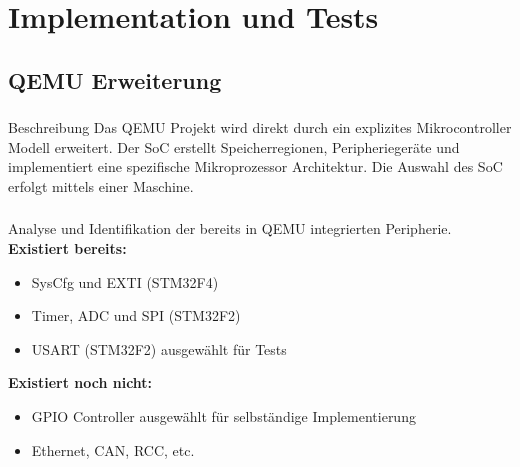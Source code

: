 
\section{Implementation und Tests}

\begin{frame}[fragile]
    \begin{center}
        \huge\textbf{\insertsection}
    \end{center}
\end{frame}

\subsection{QEMU Erweiterung}

\begin{frame}[fragile]
\frametitle{\insertsection}
\framesubtitle{\insertsubsection}

\begin{block}{Beschreibung}
Das QEMU Projekt wird direkt durch ein explizites Mikrocontroller Modell
erweitert.\newline
Der SoC erstellt Speicherregionen, Peripheriegeräte und implementiert\newline
eine spezifische Mikroprozessor Architektur.\newline
Die Auswahl des SoC erfolgt mittels einer Maschine.
\end{block}

\end{frame}

\begin{frame}[fragile]
\frametitle{\insertsection}
\framesubtitle{\insertsubsection}

Analyse und Identifikation der bereits in QEMU integrierten Peripherie.\newline
\textbf{Existiert bereits:}
\begin{itemize}
    \item SysCfg und EXTI (STM32F4)
    \item Timer, ADC und SPI (STM32F2)
    \item USART (STM32F2) \rightarrow\hspace{1mm} ausgewählt für Tests
\end{itemize}
\textbf{Existiert noch nicht:}
\begin{itemize}
    \item GPIO Controller \rightarrow\hspace{1mm} ausgewählt für selbständige
        Implementierung
    \item Ethernet, CAN, RCC, etc.
\end{itemize}

\end{frame}

